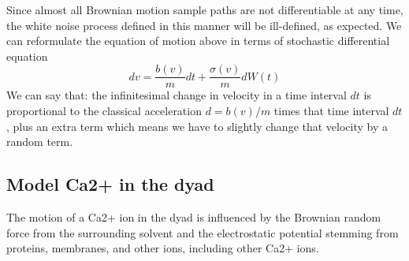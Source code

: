 Since almost all Brownian motion sample paths are not differentiable at any
time, the white noise process defined in this manner will be ill-defined, as
expected. We can reformulate the equation of motion above in terms of stochastic
differential equation
\begin{equation}
dv = \frac{b(v)}{m}dt + \frac{\sigma(v)}{m} dW(t)
\end{equation}
We can say that: the infinitesimal change in velocity in a time interval $dt$
is proportional to the classical acceleration $d=b(v)/m$ times that time
interval $dt$, plus an extra term which means
we have to slightly change that velocity by a random term.


\citep{risken1997}


\subsection{Model Ca2+ in the dyad}

The motion of a Ca2+ ion in the dyad is influenced by the Brownian random
force from the surrounding solvent and the electrostatic potential stemming
from proteins, membranes, and other ions, including other Ca2+ ions.

